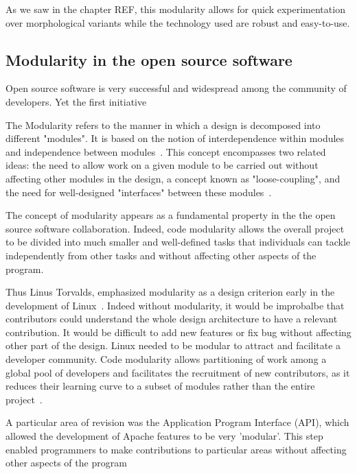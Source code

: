 As we saw in the chapter REF, this modularity allows for quick experimentation over morphological variants while the technology used are robust and easy-to-use.


\subsection{Modularity in the open source software} %

Open source software is very successful and widespread among the community of developers. Yet the first initiative

The Modularity refers to the manner in which a design is decomposed into different "modules". It is based on the notion of interdependence within modules and independence between modules~\parencite{baldwin2000design}. This concept encompasses two related ideas: the need to allow work on a given module to be carried out without affecting other modules in the design, a concept known as "loose-coupling", and the need for well-designed "interfaces" between these modules~\parencite{maccormack2006exploring}.

The concept of modularity appears as a fundamental property in the the open source software collaboration. Indeed, code modularity allows the overall project to be divided into much smaller and well-defined tasks that individuals can tackle independently from other tasks and without affecting other aspects of the program.

Thus Linus Torvalds, emphasized modularity as a design criterion early in the development of Linux~\parencite{dibona1999open}. Indeed without modularity, it would be improbalbe that contributors could understand the whole design architecture to have a relevant contribution. It would be difficult to add new features or fix bug without affecting other part of the design. Linux needed to be modular to attract and facilitate a developer community. Code modularity allows partitioning of work among a global pool of developers and facilitates the recruitment of new contributors, as it reduces their learning curve to a subset of modules rather than the entire project~\parencite{fitzgerald2004critical}.

\parencite{lerner2002some}
A particular area of revision was the Application Program Interface (API), which allowed the development of Apache features to be very 'modular'. This step enabled programmers to make contributions to particular areas without affecting other aspects of the program



